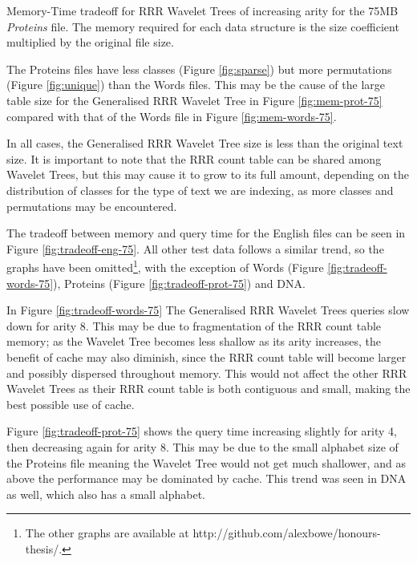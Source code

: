 			{Memory-Time tradeoff for RRR Wavelet Trees of increasing arity for
			the 75MB \emph{Proteins} file. The memory required for each data 
			structure is the size coefficient 
			multiplied by the original file size.}
		
The Proteins files have less classes (Figure \ref{fig:sparse}) but more 
permutations (Figure \ref{fig:unique}) than the Words files. This may be the 
cause of the large table size for the Generalised RRR Wavelet Tree in Figure
\ref{fig:mem-prot-75} compared with that of the Words file in Figure 
\ref{fig:mem-words-75}.

In all cases, the Generalised RRR Wavelet Tree size is less than the original
text size. It is important to note that the RRR count table can be shared among
Wavelet Trees, but this may cause it to grow to its full amount, depending on
the distribution of classes for the type of text we are indexing, as more 
classes and permutations may be encountered.

The tradeoff between memory and query time for the English files can be seen in 
Figure \ref{fig:tradeoff-eng-75}. All other test data follows a similar trend, 
so the graphs have been omitted\footnote{The 
other graphs are available at http://github.com/alexbowe/honours-thesis/.}, with 
the exception of Words (Figure 
\ref{fig:tradeoff-words-75}), Proteins (Figure \ref{fig:tradeoff-prot-75}) and
DNA.

In Figure \ref{fig:tradeoff-words-75} The Generalised RRR Wavelet Trees queries 
slow down for arity 8. This may be due to fragmentation of the RRR count table
memory; as the Wavelet Tree becomes less shallow as its arity increases, the
benefit of cache may also diminish, since the RRR count table will become
larger and possibly dispersed throughout memory. This would not affect the other
RRR Wavelet Trees as their RRR count table is both contiguous and small, making 
the best possible use of cache.

Figure \ref{fig:tradeoff-prot-75} shows the query time increasing slightly for 
arity 4, then decreasing again for arity 8. This may be due to the small 
alphabet size of the Proteins file meaning the Wavelet Tree would not get much 
shallower, and as above the performance may be dominated by cache. This trend 
was seen in DNA as well, which also has a small alphabet.
